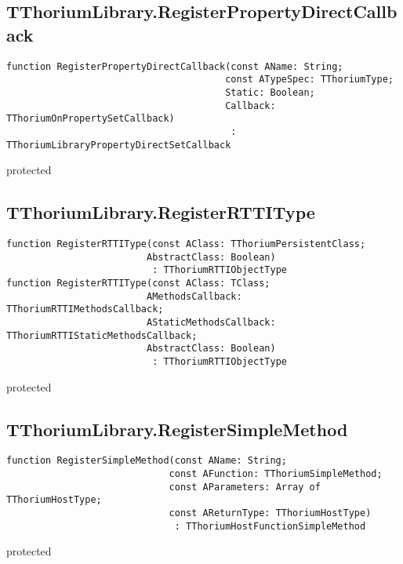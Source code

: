 \subsection{TThoriumLibrary.RegisterPropertyDirectCallback}
\label{thoriumcorepkg:thorium:tthoriumlibrary:registerpropertydirectcallback}
\begin{FPCList}
\Declaration 

\begin{verbatim}
function RegisterPropertyDirectCallback(const AName: String;
                                       const ATypeSpec: TThoriumType;
                                       Static: Boolean;
                                       Callback: TThoriumOnPropertySetCallback)
                                        : TThoriumLibraryPropertyDirectSetCallback
\end{verbatim}
\Visibility
protected
\end{FPCList}
\subsection{TThoriumLibrary.RegisterRTTIType}
\label{thoriumcorepkg:thorium:tthoriumlibrary:registerrttitype}
\begin{FPCList}
\Declaration 

\begin{verbatim}
function RegisterRTTIType(const AClass: TThoriumPersistentClass;
                         AbstractClass: Boolean)
                          : TThoriumRTTIObjectType
function RegisterRTTIType(const AClass: TClass;
                         AMethodsCallback: TThoriumRTTIMethodsCallback;
                         AStaticMethodsCallback: TThoriumRTTIStaticMethodsCallback;
                         AbstractClass: Boolean)
                          : TThoriumRTTIObjectType
\end{verbatim}
\Visibility
protected
\end{FPCList}
\subsection{TThoriumLibrary.RegisterSimpleMethod}
\label{thoriumcorepkg:thorium:tthoriumlibrary:registersimplemethod}
\begin{FPCList}
\Declaration 

\begin{verbatim}
function RegisterSimpleMethod(const AName: String;
                             const AFunction: TThoriumSimpleMethod;
                             const AParameters: Array of TThoriumHostType;
                             const AReturnType: TThoriumHostType)
                              : TThoriumHostFunctionSimpleMethod
\end{verbatim}
\Visibility
protected
\end{FPCList}
